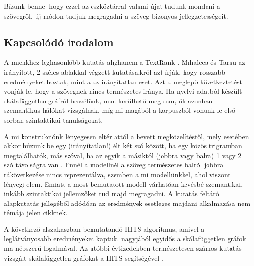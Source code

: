 \documentclass{llncs}
\newcommand{\nyil}{$\rightarrow$\ }
\newcommand{\embf}[1]{\textbf{#1}}
\newcommand{\XXX}[1]{{\small \color{megjcolor} [XXX #1]}}
\newcommand{\XXXb}[1]{\XXX{\embf{#1}}}
\begin{document}
Bízunk benne, hogy ezzel az eszköztárral
valami újat tudunk mondani a szövegről,
új módon tudjuk megragadni a szöveg bizonyos jellegzetességeit.

\subsection{Kapcsolódó irodalom}


A mienkhez leghasonlóbb kutatás alighanem a TextRank \cite{mihalcea2004textrank}.
Mihalcea és Tarau az irányított, 2-széles ablakkal végzett kutatásaikról azt
írják, hogy rosszabb eredményeket hoztak, mint a az irányítatlan eset. Azt a
meglepő következtetést vonják le, hogy a szövegnek nincs természetes iránya.
Ha nyelvi adatból készült skálafüggetlen gráfról beszélünk, nem kerülhető meg
\cite{steyvers2005large} sem, ők azonban szemantikus hálókat vizsgálnak, míg mi
magából a korpuszból vonunk le első sorban szintaktikai tanulságokat.

A mi konstrukciónk lényegesen eltér attól a bevett megközelítéstől,
mely esetében akkor húzunk be egy (irányítatlan!) élt
két szó között, ha egy közös trigramban megtalálhatók,
más szóval, ha az egyik a másiktól (jobbra vagy balra)
1 vagy 2 szó távolságra van
\cite{cancho2001thesmall}.
Ennél a modellnél a szöveg természetes balról jobbra rákövetkezése
nincs reprezentálva,
szemben a mi modellünkkel, ahol viszont lényegi elem.
%
Emiatt a most bemutatott modell várhatóan kevésbé szemantikai,
inkább szintaktikai jellemzőket tud majd megragadni.
%
A kutatás feltáró alapkutatás jellegéből adódóan
az eredmények esetleges majdani alkalmazása nem témája jelen cikknek.

A következő alszakaszban bemutatandó HITS algoritmus, amivel a leglátványosabb
eredményeket kaptuk.  nagyjából egyidős a skálafüggetlen gráfok ma népszerű
fogalmával.  Az utóbbi évtizedekben természetesen számos kutatás vizsgált
skálafüggetlen gráfokat a HITS segítségével \cite{zhang2007expertise}.
\end{document}
